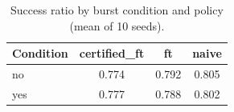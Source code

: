 \begin{table}[t]
\centering
\small
\caption{Success ratio by burst condition and policy (mean of 10 seeds).}
\label{tab:p3-burst}
\begin{tabular}{lccc}
\toprule
Condition & certified\_ft & ft & naive \\
\midrule
no & 0.774 & 0.792 & 0.805 \\
yes & 0.777 & 0.788 & 0.802 \\
\bottomrule
\end{tabular}
\par\vspace{2pt}{\footnotesize\raggedright Burst duplicates arrivals by 3x between 60 and 120 s.\par}
\end{table}
